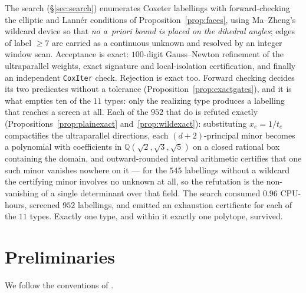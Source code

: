 \documentclass[11pt,reqno]{amsart}
\theoremstyle{plain}
\theoremstyle{definition}
\newcommand{\QQ}{\mathbb{Q}}
\newcommand{\NumRequired}{11}
\newcommand{\PlainRejected}{545}
\newcommand{\NumAssignments}{952}
\newcommand{\CPUHours}{0.96}
\begin{document}
The search (\S\ref{sec:search}) enumerates Coxeter labellings with
forward-checking the elliptic and Lann\'er conditions of
Proposition~\ref{prop:faces}, using
Ma--Zheng's wildcard device \cite[Prop.~3.5]{MaZheng2024} so that
\emph{no a~priori bound is placed on the dihedral angles}; edges of label
$\ge 7$ are carried as a continuous unknown and resolved by an integer window
scan. Acceptance is exact: $100$-digit Gauss--Newton refinement of the
ultraparallel weights, exact signature and local-isolation certification, and
finally an independent \texttt{CoxIter} check. Rejection is exact too. Forward
checking decides its two predicates without a tolerance
(Proposition~\ref{prop:exactgates}), and it is what empties ten of the
$\NumRequired$ types: only the realizing type produces a labelling that reaches a
screen at all. Each of the $\NumAssignments$ that do is refuted exactly
(Propositions~\ref{prop:plainexact} and~\ref{prop:wildexact}): substituting
$x_e=1/t_e$ compactifies the
ultraparallel directions, each $(d+2)$-principal minor becomes a polynomial with
coefficients in $\QQ(\sqrt2,\sqrt3,\sqrt5)$ on a closed rational box containing
the domain, and outward-rounded interval arithmetic certifies that one such minor
vanishes nowhere on it --- for the $\PlainRejected$ labellings without a wildcard
the certifying minor involves no unknown at all, so the refutation is the
non-vanishing of a single determinant over that field. The search consumed
$\CPUHours$ CPU-hours, screened $\NumAssignments$ labellings, and emitted an
exhaustion certificate for each of the $\NumRequired$ types. Exactly one type, and
within it exactly one polytope, survived.

\section{Preliminaries}
\label{sec:prelim}

We follow the conventions of \cite{Vinberg1985,Burcroff2024}.
\end{document}
